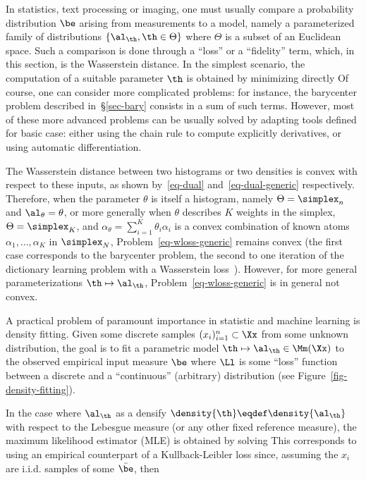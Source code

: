 In statistics, text processing or imaging, one must usually compare a probability distribution $\be$ arising from measurements to a model, namely a parameterized family of distributions $\{\al_\th,\th\in\Theta\}$ where $\Theta$ is a subset of an Euclidean space. Such a comparison is done through a ``loss'' or a ``fidelity'' term, which, in this section, is the Wasserstein distance. 
%
In the simplest scenario, the computation of a suitable parameter $\th$ is obtained by minimizing directly
Of course, one can consider more complicated problems: for instance, the barycenter problem described in~\S\ref{sec-bary} consists in a sum of such terms. However, most of these more advanced problems can be usually solved by adapting tools defined for basic case: either using the chain rule to compute explicitly derivatives, or using automatic differentiation. %

The Wasserstein distance between two histograms or two densities is convex with respect to these inputs, as shown by~\eqref{eq-dual} and~\eqref{eq-dual-generic} respectively. Therefore, when the parameter $\theta$ is itself a histogram, namely $\Theta=\simplex_n$ and $\al_\theta=\theta$, or more generally when $\theta$ describes $K$ weights in the simplex, $\Theta=\simplex_K$, and $\alpha_\theta=\sum_{i=1}^K \theta_i \alpha_i$ is a convex combination of known atoms $\alpha_1,\dots,\alpha_K$ in $\simplex_N$, Problem~\eqref{eq-wloss-generic} remains convex (the first case corresponds to the barycenter problem, the second to one iteration of the dictionary learning problem with a Wasserstein loss~\cite{pmlr-v51-rolet16}). However, for more general parameterizations $\th\mapsto \al_\th$, Problem~\eqref{eq-wloss-generic} is in general not convex. 


A practical problem of paramount importance in statistic and machine learning is density fitting. 
%
Given some discrete samples $(x_i)_{i=1}^n \subset \Xx$ from some unknown distribution, the goal is to fit a parametric model $\th \mapsto \al_\th \in \Mm(\Xx)$ to the observed empirical input measure $\be$
where $\Ll$ is some ``loss'' function between a discrete and a ``continuous'' (arbitrary) distribution (see Figure~\ref{fig-density-fitting}). 

In the case where $\al_\th$ as a densify $\density{\th} \eqdef \density{\al_\th}$ with respect to the Lebesgue measure (or any other fixed reference measure), the maximum likelihood estimator (MLE) is obtained by solving
This corresponds to using an empirical counterpart of a Kullback-Leibler loss since, assuming the $x_i$ are i.i.d. samples of some $\bar\be$, then 

